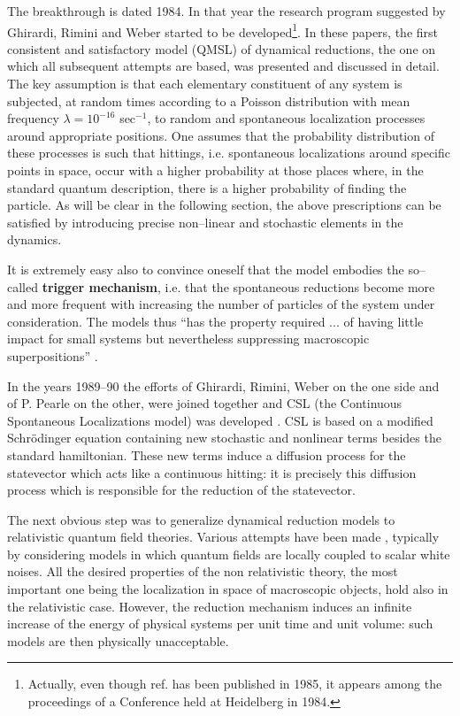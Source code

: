 \documentclass[10pt,a4paper]{article}
\begin{document}
The breakthrough is dated 1984. In that year the research program
suggested by Ghirardi, Rimini and Weber \cite{heid,grw,grw2}
started to be developed\footnote{Actually, even though
ref.\cite{heid} has been published in 1985, it appears among the
proceedings of a Conference held at Heidelberg in 1984.}. In these
papers, the first consistent and satisfactory model (QMSL) of
dynamical reductions, the one on which all subsequent attempts are
based, was presented and discussed in detail. The key assumption
is that each elementary constituent of any system is subjected, at
random times according to a Poisson distribution with mean
frequency $\lambda = 10^{-16}$ sec$^{-1}$, to random and
spontaneous localization processes around appropriate positions.
One assumes that the probability distribution of these processes
is such that hittings, i.e. spontaneous localizations around
specific points in space, occur with a higher probability at those
places where, in the standard quantum description, there is a
higher probability of finding the particle. As will be clear in
the following section, the above prescriptions can be satisfied by
introducing precise non--linear and stochastic elements in the
dynamics.

It is extremely easy also to convince oneself that the model
embodies the so--called {\bf trigger mechanism}, i.e. that the
spontaneous reductions become more and more frequent with
increasing the number of particles of the system under
consideration. The models thus ``has the property required ... of
having little impact for small systems but nevertheless
suppressing macroscopic superpositions'' \cite{bellqg}.

In the years 1989--90 the efforts of Ghirardi, Rimini, Weber on
the one side and of P. Pearle on the other, were joined together
and CSL (the Continuous Spontaneous Localizations model) was
developed \cite{csl0,csl}. CSL is based on a modified
Schr\"odinger equation containing new stochastic and  nonlinear
terms besides the standard hamiltonian. These new terms induce a
diffusion process for the statevector which acts like a continuous
hitting: it is precisely this diffusion process which is
responsible for the reduction of the statevector.

The next obvious step was to generalize dynamical reduction models
to relativistic quantum field theories. Various attempts have been
made \cite{p62, rel}, typically by considering models in which quantum
fields are locally coupled to scalar white noises. All the desired
properties of the non relativistic theory, the most important one
being the localization in space of macroscopic objects, hold also
in the relativistic case. However, the reduction mechanism induces
an infinite increase of the energy of physical systems per unit
time and unit volume: such models are then physically
unacceptable.
\end{document}
